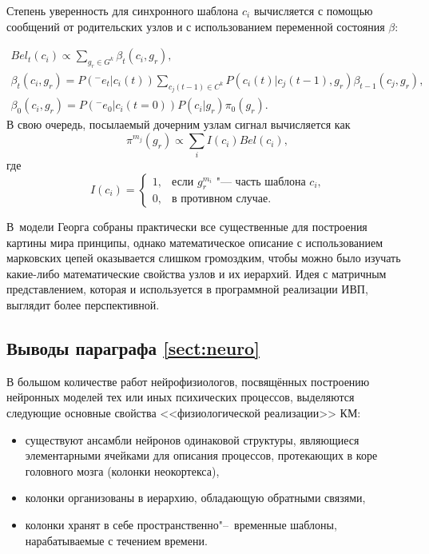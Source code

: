 Степень уверенность для синхронного шаблона $c_i$ вычисляется с помощью сообщений от родительских узлов и с использованием переменной состояния $\beta$:

\begin{equation}
	\begin{split}
		Bel_t(c_i)\varpropto\sum_{g_r\in G^k}\beta_t(c_i,g_r),\\
		\beta_t(c_i,g_r)=P({}^-e_t|c_i(t))\sum_{c_j(t-1)\in C^k}P(c_i(t)|c_j(t-1),g_r)\beta_{t-1}(c_j,g_r),\\
		\beta_0(c_i,g_r)=P({}^-e_0|c_i(t=0))P(c_i|g_r)\pi_0(g_r).
	\end{split}
\end{equation}
В свою очередь, посылаемый дочерним узлам сигнал вычисляется как
\begin{equation}
	\pi^{m_j}(g_r)\varpropto\sum_i I(c_i)Bel(c_i),
\end{equation}
где
\begin{equation}
	I(c_i)=
	\begin{cases}
		1, & \text{если $g_r^{m_i}$ "--- часть шаблона $c_i$,}\\
		0, & \text{в противном случае.}
	\end{cases}
\end{equation}

В~модели Георга собраны практически все существенные для построения картины мира принципы, однако математическое описание с использованием марковских цепей оказывается слишком громоздким, чтобы можно было изучать какие-либо математические свойства узлов и их иерархий. Идея с матричным представлением, которая и используется в программной реализации ИВП, выглядит более перспективной.

\subsection{Выводы параграфа \ref{sect:neuro}}

В большом количестве работ нейрофизиологов, посвящённых построению нейронных моделей тех или иных психических процессов, выделяются следующие основные свойства <<физиологической реализации>> КМ:
\begin{itemize}
	\item существуют ансамбли нейронов одинаковой структуры, являющиеся элементарными ячейками для описания процессов, протекающих в коре головного мозга (колонки неокортекса),
	\item колонки организованы в иерархию, обладающую обратными связями,
	\item колонки хранят в себе пространственно"--~временные шаблоны, нарабатываемые с течением времени.
\end{itemize}

